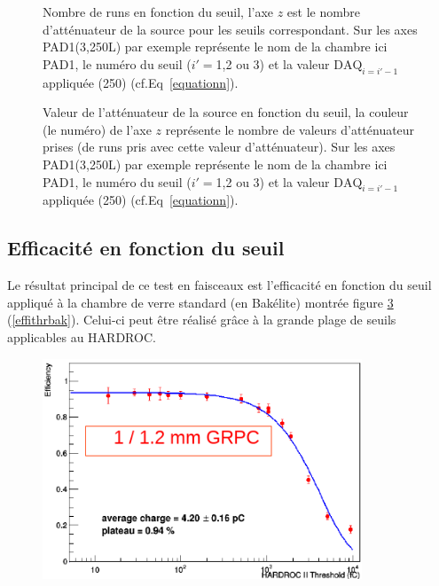 \begin{figure}[ht!]
	\centering
	\caption{Nombre de runs en fonction du seuil, l'axe $z$ est le nombre d'atténuateur de la source pour les seuils correspondant. Sur les axes PAD1(3,250L) par exemple représente le nom de la chambre ici PAD1, le numéro du seuil ($i'=$1,2 ou 3) et la valeur $\mbox{DAQ}_{i=i'-1}$ appliquée (250) (cf.Eq~\ref{equationn}).}
	\label{elogutil3}	
\end{figure}

\begin{figure}[ht!]
	\centering
	\caption{Valeur de l'atténuateur de la source en fonction du seuil, la couleur (le numéro) de l'axe $z$ représente le nombre de valeurs d'atténuateur prises (de runs pris avec cette valeur d'atténuateur). Sur les axes PAD1(3,250L) par exemple représente le nom de la chambre ici PAD1, le numéro du seuil ($i'=$1,2 ou 3) et la valeur $\mbox{DAQ}_{i=i'-1}$ appliquée (250) (cf.Eq~\ref{equationn}).}
	\label{elogutil4}	
\end{figure}

\subsection{Efficacité en fonction du seuil}
Le résultat principal de ce test en faisceaux est l'efficacité en fonction du seuil appliqué à la chambre de verre standard (en Bakélite) montrée figure \ref{effithrchi} (\ref{effithrbak}). Celui-ci peut être réalisé grâce à la grande plage de seuils applicables au HARDROC.

\begin{figure}[ht!]
	\centering
	\includegraphics[width=0.85\textwidth]{GLA/effithrchi.png}
	\label{effithrchi}
\end{figure}

